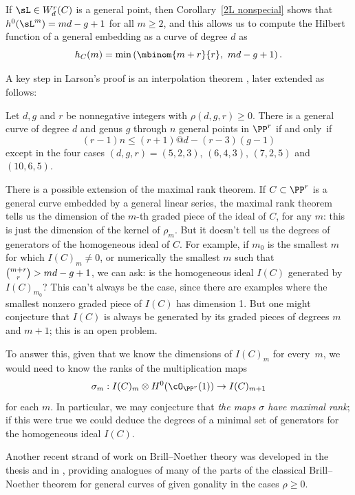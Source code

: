 If $\sL\in W^r_d(C)$ is a general point, then Corollary~\ref{2L nonspecial}
shows that $h^0(\sL ^m) = md-g+1$ for all $m \geq 2$,
and this allows us to compute the Hilbert function of a general embedding
as a curve
of degree $d$ as
 $$
 h_C(m) = \min\left(\mbinom{m+r}{r},\ md-g+1\right).
 $$

A key step in Larson's proof is an interpolation theorem \cite{MR3908670},
later extended
as follows:
%
%

\begin{npt}
\begin{theorem}[\cite{MR4653767}]\label{Larson-Vogt}
Let $d, g$ and $r$
be nonnegative integers with $\rho(d, g, r) \geq 0$. There is a general
curve of degree $d$ and genus $g$ through $n$ general
points in $\PP^r$
if and only~if
$$
(r-1)n \leq (r + 1)@d-(r-3)(g-1)
$$
except in the four cases $(d, g, r) = (5, 2, 3)$,
$(6, 4, 3)$, $(7, 2, 5)$ and $(10, 6, 5)$.
 \end{theorem}
\end{npt}

There is a possible extension of the maximal rank theorem. If $C
\subset \PP^r$ is a general curve embedded by a general linear series,
the maximal rank theorem tells us the dimension of the $m$-th graded
piece of the ideal of $C$, for any $m$: this is just the dimension of
the kernel of $\rho_m$. But it doesn't tell us the degrees of
%
generators of the homogeneous ideal of $C$. For example, if $m_0$ is
the smallest $m$ for which $I(C)_m \neq 0$, or numerically the
smallest $m$ such that $\tbinom{m+r}{r} > md-g+1$, we can ask: is the
homogeneous ideal $I(C)$ generated by $I(C)_{m_0}$? This can't always
be the case, since
there are examples where the  smallest nonzero graded piece of $I(C)$ has
dimension 1. But one might conjecture that $I(C)$ is always be generated
by its graded pieces of degrees $m$ and $m+1$; this is an open problem.

To answer this, given that we know the dimensions of $I(C)_m$ for
every~$m$, we would need to know the ranks of the multiplication
maps
$$
\sigma_m : I(C)_m \otimes H^0(\cO_{\PP^r}(1)) \to I(C)_{m+1}
$$
for each $m$. In particular, we may conjecture that \emph{the maps
$\sigma$ have maximal rank}; if this were true we could deduce the
%
degrees of a minimal set of generators for the homogeneous ideal $I(C)$.

Another recent strand of work on Brill--Noether theory was developed in
the thesis
\cite{HLarson} and in \cite{arXiv:2008.10765}, providing  analogues of
many of the parts of the classical Brill--Noether theorem
%
%
%
for general curves of given gonality in the cases $\rho\geq 0$.

